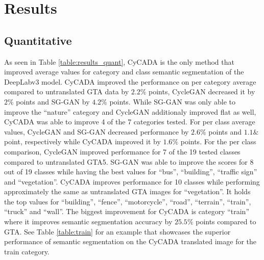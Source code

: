 \newpage

\section{Results}

\subsection{Quantitative}
As seen in Table \ref{table:results_quant}, CyCADA is the only method that improved average values for category and class semantic segmentation of the DeepLabv3 model. CyCADA improved the performance on per category average compared to untranslated GTA data by $2.2\%$ points, CycleGAN decreased it by $2\%$ points and SG-GAN by $4.2\%$ points. While SG-GAN was only able to improve the ``nature'' category and CycleGAN additionaly improved flat as well, CyCADA was able to improve 4 of the 7 categories tested. For per class average values, CycleGAN and SG-GAN decreased performance by $2.6\%$ points and $1.1\&$ point, respectively while CyCADA improved it by $1.6\%$ points. For the per class comparison, CycleGAN improved performance for 7 of the 19 tested classes compared to untranslated GTA5. SG-GAN was able to improve the scores for 8 out of 19 classes while having the best values for ``bus'', ``building'', ``traffic sign'' and ``vegetation''. CyCADA improves performance for 10 classes while performing approximately the same as untranslated GTA images for ``vegetation''. It holds the top values for ``building'', ``fence'', ``motorcycle'', ``road'', ``terrain'', ``train'', ``truck'' and ``wall''. The biggest improvement for CyCADA is category ``train'' where it improves semantic segmentation accuracy by $25.5\%$ points compared to GTA. See Table \ref{table:train} for an example that showcases the superior performance of semantic segmentation on the CyCADA translated image for the train category.

